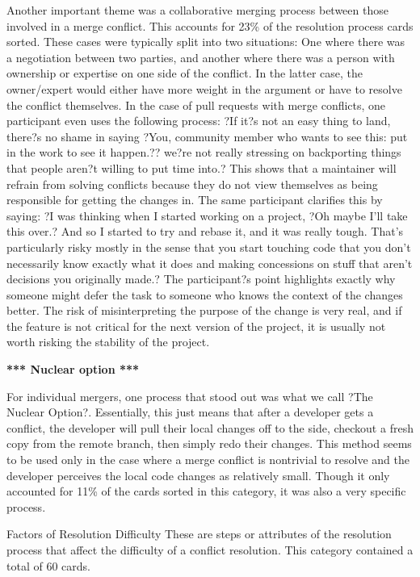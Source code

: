 \documentclass[conference]{IEEEtran}
\begin{document}
Another important theme was a collaborative merging process between those involved in a merge conflict. This accounts for 23\% of the resolution process cards sorted. These cases were typically split into two situations: One where there was a negotiation between two parties, and another where there was a person with ownership or expertise on one side of the conflict. In the latter case, the owner/expert would either have more weight in the argument or have to resolve the conflict themselves. In the case of pull requests with merge conflicts, one participant even uses the following process: 
?If it?s not an easy thing to land, there?s no shame in saying ?You, community member who wants to see this: put in the work to see it happen.?? we?re not really stressing on backporting things that people aren?t willing to put time into.? 
This shows that a maintainer will refrain from solving conflicts because they do not view themselves as being responsible for getting the changes in. The same participant clarifies this by saying:
?I was thinking when I started working on a project, ?Oh maybe I'll take this over.? And so I started to try and rebase it, and it was really tough. That's particularly risky mostly in the sense that you start touching code that you don't necessarily know exactly what it does and making concessions on stuff that aren't decisions you originally made.?
The participant?s point highlights exactly why someone might defer the task to someone who knows the context of the changes better. The risk of misinterpreting the purpose of the change is very real, and if the feature is not critical for the next version of the project, it is usually not worth risking the stability of the project.

\textbf{*** Nuclear option ***}

For individual mergers, one process that stood out was what we call ?The Nuclear Option?. Essentially, this just means that after a developer gets a conflict, the developer will pull their local changes off to the side, checkout a fresh copy from the remote branch, then simply redo their changes. This method seems to be used only in the case where a merge conflict is nontrivial to resolve and the developer perceives the local code changes as relatively small. Though it only accounted for 11\% of the cards sorted in this category, it was also a very specific process. 

Factors of Resolution Difficulty
These are steps or attributes of the resolution process that affect the difficulty of a conflict resolution. This category contained a total of 60 cards.
\end{document}
